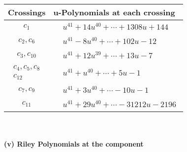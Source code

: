 \documentclass[1p]{elsarticle_modified}
\theoremstyle{definition}
\begin{document}
\begin{tabular}{m{50pt}|m{274pt}}
Crossings & \hspace{64pt}u-Polynomials at each crossing \\
\hline $$\begin{aligned}c_{1}\end{aligned}$$&$\begin{aligned}
&u^{41}+14 u^{40}+\cdots+1308 u+144
\end{aligned}$\\
\hline $$\begin{aligned}c_{2},c_{6}\end{aligned}$$&$\begin{aligned}
&u^{41}-8 u^{40}+\cdots+102 u-12
\end{aligned}$\\
\hline $$\begin{aligned}c_{3},c_{10}\end{aligned}$$&$\begin{aligned}
&u^{41}+12 u^{39}+\cdots+13 u-7
\end{aligned}$\\
\hline $$\begin{aligned}c_{4},c_{5},c_{8}\\c_{12}\end{aligned}$$&$\begin{aligned}
&u^{41}+u^{40}+\cdots+5 u-1
\end{aligned}$\\
\hline $$\begin{aligned}c_{7},c_{9}\end{aligned}$$&$\begin{aligned}
&u^{41}+3 u^{40}+\cdots-10 u-1
\end{aligned}$\\
\hline $$\begin{aligned}c_{11}\end{aligned}$$&$\begin{aligned}
&u^{41}+29 u^{40}+\cdots-31212 u-2196
\end{aligned}$\\
\hline
\end{tabular}\\~\\
\newpage\renewcommand{\arraystretch}{1}
\flushleft \textbf{(v) Riley Polynomials at the component}\newline \\
\end{document}
